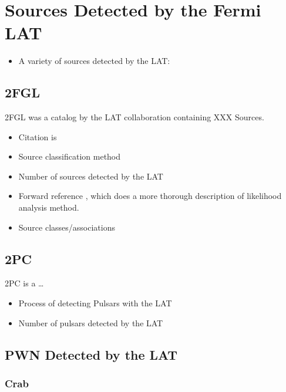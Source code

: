 
\section{Sources Detected by the Fermi \Acrlong{LAT}}

\begin{itemize}
  \item A variety of sources detected by the \Acrlong{LAT}:
\end{itemize}

\subsection{\Acrlong{2FGL}}

\Gls{2FGL} was a catalog by the LAT collaboration containing XXX Sources.

\begin{itemize}
  \item Citation is \cite{nolan_2012_fermi-large}
  \item Source classification method
  \item Number of sources detected by the \gls{LAT}
  \item Forward reference ,
    which does a more thorough description of likelihood analysis method.
  \item Source classes/associations
\end{itemize}

\subsection{\Acrlong{2PC}}

\Gls{2PC} is a \ldots
{}

\begin{itemize}
  \item Process of detecting Pulsars with the \gls{LAT}
  \item Number of pulsars detected by the \gls{LAT}
\end{itemize}

\subsection{\Acrlong{PWN} Detected by the \Acrlong{LAT}}

\subsubsection{Crab}

